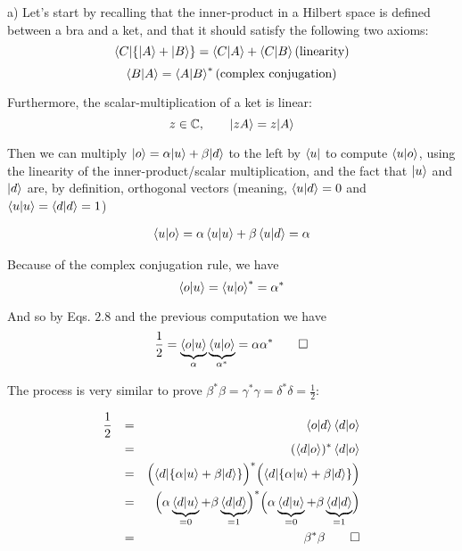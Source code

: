 \documentclass[solutions.tex]{subfiles}
\begin{document}
\hrr

a) Let's start by recalling that the inner-product in a Hilbert
space is defined between a bra and a ket, and that it should satisfy
the following two axioms:
\[
	\langle C|\{|A\rangle+|B\rangle\} = \left\langle C \middle| A \right\rangle + \left\langle C \middle| B \right\rangle
	(\text{linearity})
\]
\[
	\left\langle B \middle| A \right\rangle = \left\langle A \middle| B \right\rangle^* (\text{complex conjugation})
\]

Furthermore, the scalar-multiplication of a ket is linear:
\[
	z\in\mathbb{C},\qquad |zA\rangle = z|A\rangle
\]

Then we can multiply $|o\rangle = \alpha|u\rangle + \beta|d\rangle$ to
the left by $\langle u|$ to compute $\left\langle u \middle| o \right\rangle$, using the linearity
of the inner-product/scalar multiplication, and the fact that $|u\rangle$
and $|d\rangle$ are, by definition, orthogonal vectors (meaning,
$\left\langle u \middle| d \right\rangle = 0$ and $\left\langle u \middle| u \right\rangle=\left\langle d \middle| d \right\rangle = 1$)

\begin{equation*}\begin{aligned}
	\left\langle u \middle| o \right\rangle = \alpha\left\langle u \middle| u \right\rangle +\beta\left\langle u \middle| d \right\rangle = \alpha
\end{aligned}\end{equation*}

Because of the complex conjugation rule, we have
\[
	\left\langle o \middle| u \right\rangle = \left\langle u \middle| o \right\rangle^* = \alpha^*
\]

And so by Eqs. $2.8$ and the previous computation we have
\[
	\frac12 = \underbrace{\left\langle o \middle| u \right\rangle}_\alpha
		\underbrace{\left\langle u \middle| o \right\rangle}_{\alpha^*} = \alpha\alpha^* \qed
\]

The process is very similar to prove $\beta^*\beta = \gamma^*\gamma
= \delta^*\delta = \frac12$:

\begin{equation*}\begin{aligned}
	\frac12 &&=&& \left\langle o \middle| d \right\rangle\left\langle d \middle| o \right\rangle \\
	~ &&=&& (\left\langle d \middle| o \right\rangle)^*\left\langle d \middle| o \right\rangle \\
	~ &&=&& \Bigl(\langle d|\{\alpha|u\rangle + \beta|d\rangle\}\Bigr)^*
		\Bigl(\langle d|\{\alpha|u\rangle + \beta|d\rangle\}\Bigr) \\
	~ &&=&& \Bigl(\alpha\underbrace{\left\langle d \middle| u \right\rangle}_{=0} +
			\beta\underbrace{\left\langle d \middle| d \right\rangle}_{=1}\Bigr)^*
		\Bigl(\alpha\underbrace{\left\langle d \middle| u \right\rangle}_{=0} +
			\beta\underbrace{\left\langle d \middle| d \right\rangle}_{=1}\Bigr) \\
	~ &&=&& \beta^*\beta\qed
\end{aligned}\end{equation*}
\end{document}
